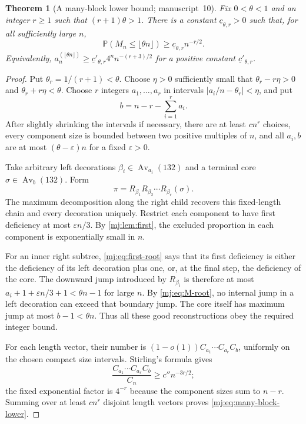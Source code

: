 \documentclass[11pt,a4paper]{article}
\newtheorem{theorem}{Theorem}[section]
\theoremstyle{definition}\newaliascnt{definition}{theorem}
\theoremstyle{remark}\newaliascnt{remark}{theorem}
\newcommand{\Av}{\operatorname{Av}}
\newcommand{\ljP}{\mathbb P}
\begin{document}
\begin{theorem}[A many-block lower bound; manuscript~10]
\label{mj:thm:lower}
Fix $0<\theta<1$ and an integer $r\ge1$ such that $(r+1)\theta>1$. There is
a constant $\underline c_{\theta,r}>0$ such that, for all sufficiently large
$n$,
\begin{equation}
 \ljP(M_n\le\lfloor\theta n\rfloor)
 \ge \underline c_{\theta,r}n^{-r/2}.
 \label{mj:eq:many-block-lower}
\end{equation}
Equivalently, $a_n^{(\lfloor\theta n\rfloor)}\ge\underline c'_{\theta,r}
4^n n^{-(r+3)/2}$ for a positive constant $\underline c'_{\theta,r}$.
\end{theorem}
\begin{proof}
Put $\theta_r=1/(r+1)<\theta$. Choose $\eta>0$ sufficiently small that
$\theta_r-r\eta>0$ and $\theta_r+r\eta<\theta$. Choose $r$ integers
$a_1,\ldots,a_r$ in intervals $|a_i/n-\theta_r|<\eta$, and put
\[
 b=n-r-\sum_{i=1}^ra_i.
\]
After slightly shrinking the intervals if necessary, there are at least
$c n^r$ choices, every component size is bounded between two positive
multiples of $n$, and all $a_i,b$ are at most $(\theta-\varepsilon)n$ for a
fixed $\varepsilon>0$.

Take arbitrary left decorations $\beta_i\in\Av_{a_i}(132)$ and a terminal
core $\sigma\in\Av_b(132)$. Form
\[
 \pi=R_{\beta_1}R_{\beta_2}\cdots R_{\beta_r}(\sigma).
\]
The maximum decomposition along the right child recovers this fixed-length
chain and every decoration uniquely. Restrict each component to have first
deficiency at most $\varepsilon n/3$. By \cref{mj:lem:first}, the excluded
proportion in each component is exponentially small in $n$.

For an inner right subtree, \eqref{mj:eq:first-root} says that its first
deficiency is either the deficiency of its left decoration plus one, or, at
the final step, the deficiency of the core. The downward jump introduced by
$R_{\beta_i}$ is therefore at most $a_i+1+\varepsilon n/3+1<\theta n-1$ for
large $n$. By \eqref{mj:eq:M-root}, no internal jump in a left decoration can
exceed that boundary jump. The core itself has maximum jump at most
$b-1<\theta n$. Thus all these good reconstructions obey the required
integer bound.

For each length vector, their number is
$(1-o(1))C_{a_1}\cdots C_{a_r}C_b$, uniformly on the chosen compact size
intervals. Stirling's formula gives
\[
 \frac{C_{a_1}\cdots C_{a_r}C_b}{C_n}
 \ge c''n^{-3r/2};
\]
the fixed exponential factor is $4^{-r}$ because the component sizes sum to
$n-r$. Summing over at least $c n^r$ disjoint length vectors proves
\eqref{mj:eq:many-block-lower}.
\end{proof}
\end{document}
